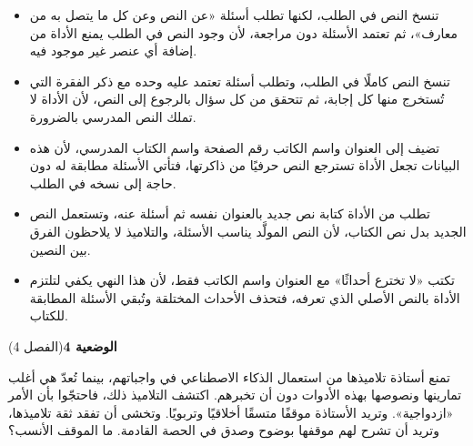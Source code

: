 \documentclass[11pt,a4paper]{article}
\begin{document}
\begin{itemize}[leftmargin=1.0cm, labelsep=6pt, itemsep=3pt, topsep=4pt, parsep=0pt]
  \item[\textbf{أ)}] تنسخ النص في الطلب، لكنها تطلب أسئلة «عن النص وعن كل ما يتصل به من معارف»، ثم تعتمد الأسئلة دون مراجعة، لأن وجود النص في الطلب يمنع الأداة من إضافة أي عنصر غير موجود فيه.
  \item[\textbf{ب)}] تنسخ النص كاملًا في الطلب، وتطلب أسئلة تعتمد عليه وحده مع ذكر الفقرة التي تُستخرج منها كل إجابة، ثم تتحقق من كل سؤال بالرجوع إلى النص، لأن الأداة لا تملك النص المدرسي بالضرورة.
  \item[\textbf{ج)}] تضيف إلى العنوان واسم الكاتب رقم الصفحة واسم الكتاب المدرسي، لأن هذه البيانات تجعل الأداة تسترجع النص حرفيًا من ذاكرتها، فتأتي الأسئلة مطابقة له دون حاجة إلى نسخه في الطلب.
  \item[\textbf{د)}] تطلب من الأداة كتابة نص جديد بالعنوان نفسه ثم أسئلة عنه، وتستعمل النص الجديد بدل نص الكتاب، لأن النص المولَّد يناسب الأسئلة، والتلاميذ لا يلاحظون الفرق بين النصين.
  \item[\textbf{هـ)}] تكتب «لا تخترع أحداثًا» مع العنوان واسم الكاتب فقط، لأن هذا النهي يكفي لتلتزم الأداة بالنص الأصلي الذي تعرفه، فتحذف الأحداث المختلقة وتُبقي الأسئلة المطابقة للكتاب.
\end{itemize}
\par\vspace{6pt}
\noindent
{\large\khatt\textbf{الوضعية 4}}\hfill{\small(الفصل 4)}\par\nopagebreak\vspace{3pt}
\setlength{\fboxsep}{7pt}\colorbox{gray!10}{\parbox{\dimexpr\linewidth-14pt}{تمنع أستاذة تلاميذها من استعمال الذكاء الاصطناعي في واجباتهم، بينما تُعدّ هي أغلب تمارينها ونصوصها بهذه الأدوات دون أن تخبرهم. اكتشف التلاميذ ذلك، فاحتجّوا بأن الأمر «ازدواجية». وتريد الأستاذة موقفًا متسقًا أخلاقيًا وتربويًا. وتخشى أن تفقد ثقة تلاميذها، وتريد أن تشرح لهم موقفها بوضوح وصدق في الحصة القادمة. ما الموقف الأنسب؟}}\par\nopagebreak
\end{document}
